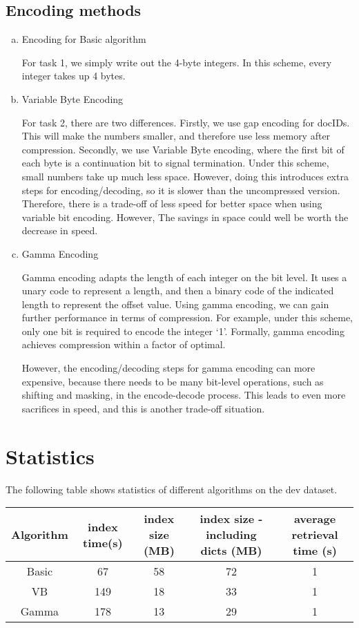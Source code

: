 \documentclass[10pt]{article}
\begin{document}
\subsection{Encoding methods}
\begin{enumerate}[(a)]
\item Encoding for Basic algorithm

For task 1, we simply write out the 4-byte integers. In this scheme, every integer takes up 4 bytes.
\item Variable Byte Encoding

For task 2, there are two differences. Firstly, we use gap encoding for docIDs. This will make the numbers smaller, and therefore use less memory after compression. Secondly, we use Variable Byte encoding, where the first bit of each byte is a continuation bit to signal termination. Under this scheme, small numbers take up much less space. However, doing this introduces extra steps for encoding/decoding, so it is slower than the uncompressed version. Therefore, there is a trade-off of less speed for better space when using variable bit encoding. However, The savings in space could well be worth the decrease in speed.
\item Gamma Encoding

Gamma encoding adapts the length of each integer on the bit level. It uses a unary code to represent a length, and then a binary code of the indicated length to represent the offset value. Using gamma encoding, we can gain further performance in terms of compression. For example, under this scheme, only one bit is required to encode the integer `1'. Formally, gamma encoding achieves compression within a factor of optimal.

However, the encoding/decoding steps for gamma encoding can more expensive, because there needs to be many bit-level operations, such as shifting and masking, in the encode-decode process. This leads to even more sacrifices in speed, and this is another trade-off situation.
\end{enumerate}

\section{Statistics}
The following table shows statistics of different algorithms on the dev dataset.
\begin{table}[ht]
\begin{tabular}{| c | c | c | c | c |}
\hline
Algorithm & index time(s) & index size (MB) & index size - including dicts (MB) & average retrieval time (s)\\\hline
Basic & 67 & 58 & 72 & 1\\\hline
VB & 149 & 18 & 33 & 1\\\hline
Gamma & 178 & 13 & 29 & 1\\\hline
\end{tabular}
\end{table}
\end{document}
